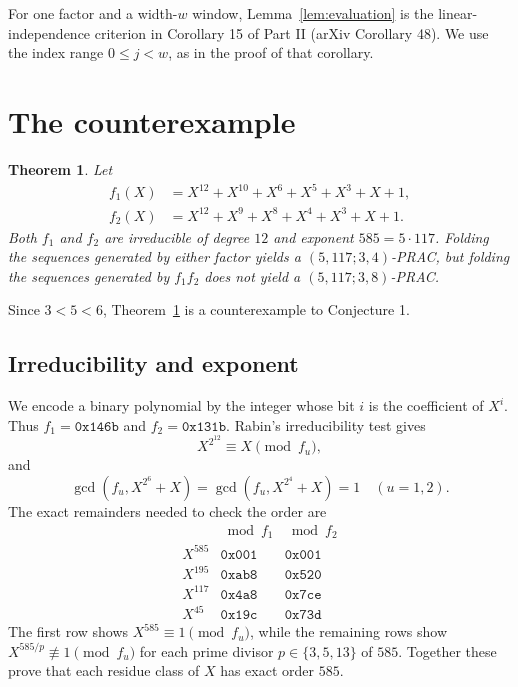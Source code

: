\documentclass[11pt]{article}
\newtheorem{theorem}{Theorem}
\begin{document}
For one factor and a width-\(w\) window, Lemma~\ref{lem:evaluation} is the
linear-independence criterion in Corollary 15 of Part II
(arXiv Corollary 48).  We use the
index range \(0\leq j<w\), as in the proof of that corollary.

\section{The counterexample}

\begin{theorem}
\label{thm:counterexample}
Let
\[
\begin{aligned}
 f_1(X)&=X^{12}+X^{10}+X^6+X^5+X^3+X+1,\\
 f_2(X)&=X^{12}+X^9+X^8+X^4+X^3+X+1.
\end{aligned}
\]
Both \(f_1\) and \(f_2\) are irreducible of degree \(12\) and exponent
\(585=5\cdot117\).  Folding the sequences generated by either factor
yields a \((5,117;3,4)\)-PRAC, but folding the sequences generated by
\(f_1f_2\) does not yield a \((5,117;3,8)\)-PRAC.
\end{theorem}

Since \(3<5<6\), Theorem~\ref{thm:counterexample} is a counterexample to
Conjecture 1.

\subsection{Irreducibility and exponent}

We encode a binary polynomial by the integer whose bit \(i\) is the
coefficient of \(X^i\).  Thus \(f_1=\mathtt{0x146b}\) and
\(f_2=\mathtt{0x131b}\).  Rabin's irreducibility test gives
\[
 X^{2^{12}}\equiv X\pmod {f_u},
\]
and
\[
\gcd(f_u,X^{2^6}+X)=\gcd(f_u,X^{2^4}+X)=1
\quad (u=1,2).
\]
The exact remainders needed to check the order are
\[
\begin{array}{c|cc}
 &\bmod f_1&\bmod f_2\\ \hline
X^{585}&\mathtt{0x001}&\mathtt{0x001}\\
X^{195}&\mathtt{0xab8}&\mathtt{0x520}\\
X^{117}&\mathtt{0x4a8}&\mathtt{0x7ce}\\
X^{45} &\mathtt{0x19c}&\mathtt{0x73d}
\end{array}
\]
The first row shows \(X^{585}\equiv1\pmod{f_u}\), while the remaining
rows show \(X^{585/p}\not\equiv1\pmod{f_u}\) for each prime divisor
\(p\in\{3,5,13\}\) of \(585\).  Together these prove that each
residue class of \(X\) has exact order \(585\).
\end{document}
